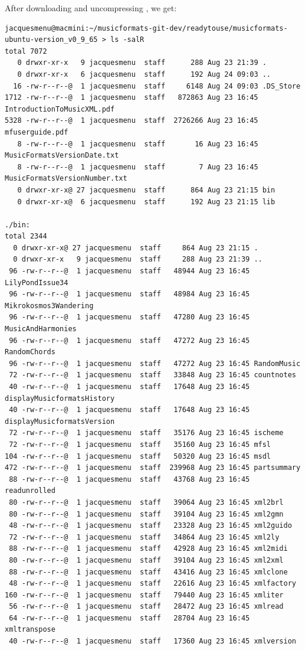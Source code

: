 After downloading and uncompressing , we get:
\begin{lstlisting}[language=Terminal]
jacquesmenu@macmini:~/musicformats-git-dev/readytouse/musicformats-ubuntu-version_v0_9_65 > ls -salR
total 7072
   0 drwxr-xr-x   9 jacquesmenu  staff      288 Aug 23 21:39 .
   0 drwxr-xr-x   6 jacquesmenu  staff      192 Aug 24 09:03 ..
  16 -rw-r--r--@  1 jacquesmenu  staff     6148 Aug 24 09:03 .DS_Store
1712 -rw-r--r--@  1 jacquesmenu  staff   872863 Aug 23 16:45 IntroductionToMusicXML.pdf
5328 -rw-r--r--@  1 jacquesmenu  staff  2726266 Aug 23 16:45 mfuserguide.pdf
   8 -rw-r--r--@  1 jacquesmenu  staff       16 Aug 23 16:45 MusicFormatsVersionDate.txt
   8 -rw-r--r--@  1 jacquesmenu  staff        7 Aug 23 16:45 MusicFormatsVersionNumber.txt
   0 drwxr-xr-x@ 27 jacquesmenu  staff      864 Aug 23 21:15 bin
   0 drwxr-xr-x@  6 jacquesmenu  staff      192 Aug 23 21:15 lib

./bin:
total 2344
  0 drwxr-xr-x@ 27 jacquesmenu  staff     864 Aug 23 21:15 .
  0 drwxr-xr-x   9 jacquesmenu  staff     288 Aug 23 21:39 ..
 96 -rw-r--r--@  1 jacquesmenu  staff   48944 Aug 23 16:45 LilyPondIssue34
 96 -rw-r--r--@  1 jacquesmenu  staff   48984 Aug 23 16:45 Mikrokosmos3Wandering
 96 -rw-r--r--@  1 jacquesmenu  staff   47280 Aug 23 16:45 MusicAndHarmonies
 96 -rw-r--r--@  1 jacquesmenu  staff   47272 Aug 23 16:45 RandomChords
 96 -rw-r--r--@  1 jacquesmenu  staff   47272 Aug 23 16:45 RandomMusic
 72 -rw-r--r--@  1 jacquesmenu  staff   33848 Aug 23 16:45 countnotes
 40 -rw-r--r--@  1 jacquesmenu  staff   17648 Aug 23 16:45 displayMusicformatsHistory
 40 -rw-r--r--@  1 jacquesmenu  staff   17648 Aug 23 16:45 displayMusicformatsVersion
 72 -rw-r--r--@  1 jacquesmenu  staff   35176 Aug 23 16:45 ischeme
 72 -rw-r--r--@  1 jacquesmenu  staff   35160 Aug 23 16:45 mfsl
104 -rw-r--r--@  1 jacquesmenu  staff   50320 Aug 23 16:45 msdl
472 -rw-r--r--@  1 jacquesmenu  staff  239968 Aug 23 16:45 partsummary
 88 -rw-r--r--@  1 jacquesmenu  staff   43768 Aug 23 16:45 readunrolled
 80 -rw-r--r--@  1 jacquesmenu  staff   39064 Aug 23 16:45 xml2brl
 80 -rw-r--r--@  1 jacquesmenu  staff   39104 Aug 23 16:45 xml2gmn
 48 -rw-r--r--@  1 jacquesmenu  staff   23328 Aug 23 16:45 xml2guido
 72 -rw-r--r--@  1 jacquesmenu  staff   34864 Aug 23 16:45 xml2ly
 88 -rw-r--r--@  1 jacquesmenu  staff   42928 Aug 23 16:45 xml2midi
 80 -rw-r--r--@  1 jacquesmenu  staff   39104 Aug 23 16:45 xml2xml
 88 -rw-r--r--@  1 jacquesmenu  staff   43416 Aug 23 16:45 xmlclone
 48 -rw-r--r--@  1 jacquesmenu  staff   22616 Aug 23 16:45 xmlfactory
160 -rw-r--r--@  1 jacquesmenu  staff   79440 Aug 23 16:45 xmliter
 56 -rw-r--r--@  1 jacquesmenu  staff   28472 Aug 23 16:45 xmlread
 64 -rw-r--r--@  1 jacquesmenu  staff   28704 Aug 23 16:45 xmltranspose
 40 -rw-r--r--@  1 jacquesmenu  staff   17360 Aug 23 16:45 xmlversion


\end{lstlisting}
